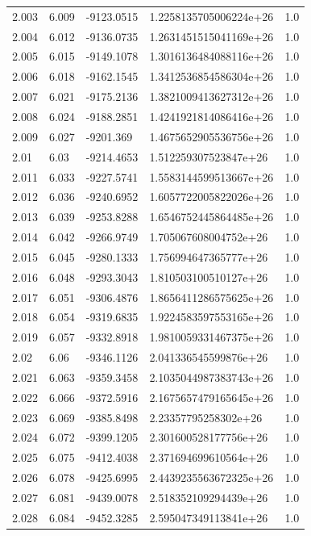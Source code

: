 \begin{tabular}{lllll}
2.003 & 6.009 & -9123.0515 & 1.2258135705006224e+26 & 1.0 \\
2.004 & 6.012 & -9136.0735 & 1.2631451515041169e+26 & 1.0 \\
2.005 & 6.015 & -9149.1078 & 1.3016136484088116e+26 & 1.0 \\
2.006 & 6.018 & -9162.1545 & 1.3412536854586304e+26 & 1.0 \\
2.007 & 6.021 & -9175.2136 & 1.3821009413627312e+26 & 1.0 \\
2.008 & 6.024 & -9188.2851 & 1.4241921814086416e+26 & 1.0 \\
2.009 & 6.027 & -9201.369 & 1.4675652905536756e+26 & 1.0 \\
2.01 & 6.03 & -9214.4653 & 1.512259307523847e+26 & 1.0 \\
2.011 & 6.033 & -9227.5741 & 1.5583144599513667e+26 & 1.0 \\
2.012 & 6.036 & -9240.6952 & 1.6057722005822026e+26 & 1.0 \\
2.013 & 6.039 & -9253.8288 & 1.6546752445864485e+26 & 1.0 \\
2.014 & 6.042 & -9266.9749 & 1.705067608004752e+26 & 1.0 \\
2.015 & 6.045 & -9280.1333 & 1.756994647365777e+26 & 1.0 \\
2.016 & 6.048 & -9293.3043 & 1.810503100510127e+26 & 1.0 \\
2.017 & 6.051 & -9306.4876 & 1.8656411286575625e+26 & 1.0 \\
2.018 & 6.054 & -9319.6835 & 1.9224583597553165e+26 & 1.0 \\
2.019 & 6.057 & -9332.8918 & 1.9810059331467375e+26 & 1.0 \\
2.02 & 6.06 & -9346.1126 & 2.041336545599876e+26 & 1.0 \\
2.021 & 6.063 & -9359.3458 & 2.1035044987383743e+26 & 1.0 \\
2.022 & 6.066 & -9372.5916 & 2.1675657479165645e+26 & 1.0 \\
2.023 & 6.069 & -9385.8498 & 2.23357795258302e+26 & 1.0 \\
2.024 & 6.072 & -9399.1205 & 2.301600528177756e+26 & 1.0 \\
2.025 & 6.075 & -9412.4038 & 2.371694699610564e+26 & 1.0 \\
2.026 & 6.078 & -9425.6995 & 2.4439235563672325e+26 & 1.0 \\
2.027 & 6.081 & -9439.0078 & 2.518352109294439e+26 & 1.0 \\
2.028 & 6.084 & -9452.3285 & 2.595047349113841e+26 & 1.0 \\

\end{tabular}

